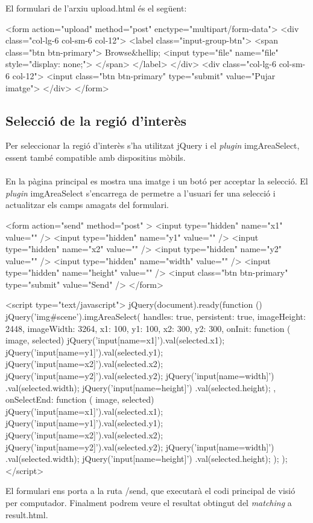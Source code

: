 \newpage
\noindent
El formulari de l'arxiu upload.html és el següent:\\

		\begin{txt}
<form action="upload" method="post" 
	enctype="multipart/form-data">
	<div class="col-lg-6 col-sm-6 col-12">
		<label class="input-group-btn">
			<span class="btn btn-primary">
				Browse&hellip; <input type="file" 
					name="file" style="display: none;">
			</span>
		</label>
	</div>
	<div class="col-lg-6 col-sm-6 col-12">
		<input class="btn btn-primary" type="submit"
			value="Pujar imatge">
	</div>
</form>
		\end{txt}

	\subsection{Selecció de la regió d'interès}
		Per seleccionar la regió d'interès s'ha utilitzat jQuery i el \textit{plugin} imgAreaSelect, essent també compatible amb dispositius mòbils.\\\\
		En la pàgina principal es mostra una imatge i un botó per acceptar la selecció. El \textit{plugin} imgAreaSelect s'encarrega de permetre a l'usuari fer una selecció i actualitzar els camps
		amagats del formulari.\\
		\begin{txt}
<form action="send" method="post" >
	<input type="hidden" name="x1" value="" />
	<input type="hidden" name="y1" value="" />
	<input type="hidden" name="x2" value="" />
	<input type="hidden" name="y2" value="" />
	<input type="hidden" name="width" value="" />
	<input type="hidden" name="height" value="" />
	<input class="btn btn-primary" type="submit"
		value="Send" />
</form>

<script type="text/javascript">
	jQuery(document).ready(function () {
		jQuery('img#scene').imgAreaSelect({
			handles: true,
			persistent: true,
			imageHeight: 2448,
			imageWidth: 3264,
			x1: 100, y1: 100, x2: 300, y2: 300,
			onInit: function ( image, selected) {
				jQuery('input[name=x1]').val(selected.x1);
				jQuery('input[name=y1]').val(selected.y1);
				jQuery('input[name=x2]').val(selected.x2);
				jQuery('input[name=y2]').val(selected.y2);
				jQuery('input[name=width]')
					.val(selected.width);
				jQuery('input[name=height]')
					.val(selected.height);
			},
			onSelectEnd: function ( image, selected) {
				jQuery('input[name=x1]').val(selected.x1);
				jQuery('input[name=y1]').val(selected.y1);
				jQuery('input[name=x2]').val(selected.x2);
				jQuery('input[name=y2]').val(selected.y2);
				jQuery('input[name=width]')
					.val(selected.width);
				jQuery('input[name=height]')
					.val(selected.height);
			}
		});
	});
 </script>
		\end{txt}
\noindent
El formulari ens porta a la ruta /send, que executarà el codi principal de visió per computador. Finalment podrem veure el resultat obtingut del \textit{matching} a result.html.\\


